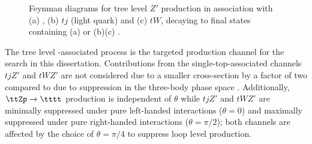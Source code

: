 \documentclass[../thesis.tex]{subfiles}
\begin{document}
\begin{figure}[!htbp]
\centering
{}
\caption[Feynman diagrams for tree level $Z'$ production in association with (a) \ttbar, (b) $tj$ (light quark) and (c) $tW$, decaying to final states containing (a) \tttt or (b)(c) \ttt.]{\label{fig:theory:ttZp_feynman}Feynman diagrams for tree level $Z'$ production in association with (a) \ttbar, (b) $tj$ (light quark) and (c) $tW$, decaying to final states containing (a) \tttt or (b)(c) \ttt \citep{theory:ttZp}.}
\end{figure}

The tree level \ttbar-associated process \ttZp is the targeted production channel for the search in this dissertation. Contributions from the single-top-associated channels $tjZ'$ and $tWZ'$ are not considered due to a smaller cross-section by a factor of two compared to \ttZp due to suppression in the three-body phase space \citep{theory:ttZp}. Additionally, $\ttZp\rightarrow\tttt$ production is independent of $\theta$ while $tjZ'$ and $tWZ'$ are minimally suppressed under pure left-handed interactions ($\theta=0$) and maximally suppressed under pure right-handed interactions ($\theta=\pi/2$); both channels are affected by the choice of $\theta=\pi/4$ to suppress loop level production.
\end{document}
